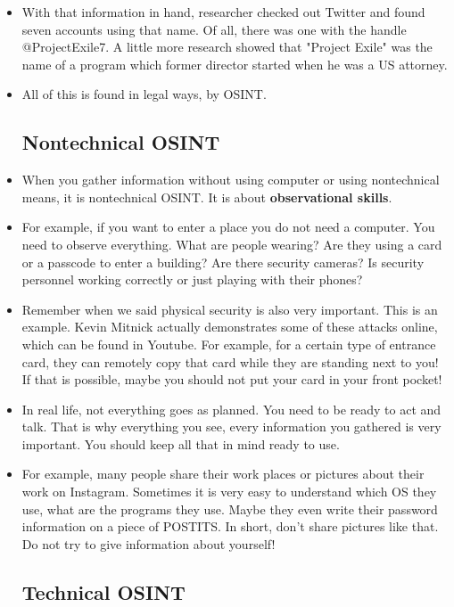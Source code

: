 \documentclass[12pt]{article}
\newcommand{\red}[1]{{\color{red} #1}}
\begin{document}
\begin{itemize}[itemsep=3em]
	\item With that information in hand, researcher checked out Twitter and found seven accounts using that name. Of all, there was one with the handle @ProjectExile7. A little more research showed that "Project Exile" was the name of a program which former director started when he was a US attorney.
	
	\item All of this is found in legal ways, by OSINT. 
	

	\subsection{Nontechnical OSINT}
	
	\item When you gather information without using computer or using nontechnical means, it is nontechnical OSINT. It is about \textbf{observational skills}.
	
	\item For example, if you want to enter a place you do not need a computer. You need to observe everything. What are people wearing? Are they using a card or a passcode to enter a building? Are there security cameras? Is security personnel working correctly or just playing with their phones? 
	
	\item Remember when we said physical security is also very important. This is an example. Kevin Mitnick actually demonstrates some of these attacks online, which can be found in Youtube. For example, for a certain type of entrance card, they can remotely copy that card while they are standing next to you! \red{If that is possible, maybe you should not put your card in your front pocket!}
	
	\item In real life, not everything goes as planned. You need to be ready to act and talk. That is why everything you see, every information you gathered is very important. You should keep all that in mind ready to use.
	
	\item For example, many people share their work places or pictures about their work on Instagram. Sometimes it is very easy to understand which OS they use, what are the programs they use. Maybe they even write their password information on a piece of POSTITS. In short, don't share pictures like that. Do not try to give information about yourself!
	

	\subsection{Technical OSINT}
	

\end{itemize}
\end{document}
